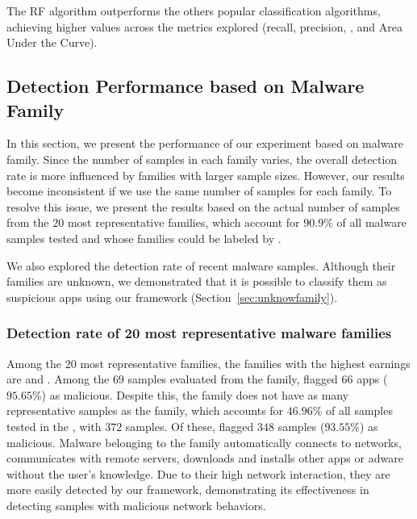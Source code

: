 \begin{finding}
  The RF algorithm outperforms the others popular classification algorithms, achieving higher values across the metrics explored (recall, precision, \fone, and Area Under the Curve).
\end{finding}



\subsection{Detection Performance based on Malware Family}\label{sec:family-assessment}

In this section, we present the performance of our experiment based on malware family. Since the number of samples in each family varies, the overall detection rate is more influenced by families with larger sample sizes. However, our results become inconsistent if we use the same number of samples for each family. To resolve this issue, we present the results based on the actual number of samples from the $20$ most representative families, which account for $90.9\%$ of all malware samples tested and whose families could be labeled by \vt.

We also explored the detection rate of recent malware samples. Although their families are unknown, we demonstrated that it is possible to classify them as suspicious apps using our framework (Section~\ref{sec:unknowfamily}).


\subsubsection{Detection rate of 20 most representative malware families}\label{sec:familyDetection}


Among the $20$ most representative families, the families with the highest earnings are \gps and \dwg. Among the $69$ samples evaluated from the \dwg family, \droidxpflow flagged $66$ apps ($95.65\%$) as malicious. Despite this, the \dwg family does not have as many representative samples as the \gps family, which accounts for $46.96\%$ of all samples tested in the \fds, with $372$ samples. Of these, \droidxpflow flagged $348$ samples ($93.55$\%) as malicious. Malware belonging to the \gps family automatically connects to networks, communicates with remote servers, downloads and installs other apps or adware without the user’s knowledge\cite{DBLP:journals/jnca/WangCYYPJ19}. Due to their high network interaction, they are more easily detected by our framework, demonstrating its effectiveness in detecting samples with malicious network behaviors.


